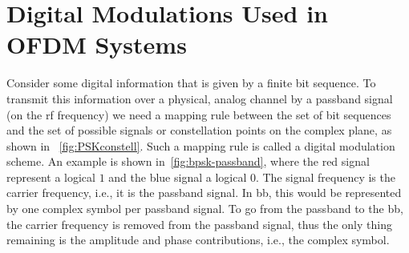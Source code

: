 \section{Digital Modulations Used in OFDM Systems}\label{sec:cohmod}
%
Consider some digital information that is given by a finite bit sequence. To transmit this information over a physical, analog channel by a passband signal (on the \gls{rf} frequency) we need a mapping rule between the set of bit sequences and the set of possible signals or constellation points on the complex plane, as shown in ~\cref{fig:PSKconstell}. Such a mapping rule is called a digital modulation scheme. An example is shown in~\cref{fig:bpsk-passband}, where the red signal represent a logical $1$ and the blue signal a logical $0$. The signal frequency is the carrier frequency, i.e., it is the passband signal. In \acrlong{bb}, this would be represented by one complex symbol per passband signal. To go from the passband to the \gls{bb}, the carrier frequency is removed from the passband signal, thus the only thing remaining is the amplitude and phase contributions, i.e., the complex symbol. 

